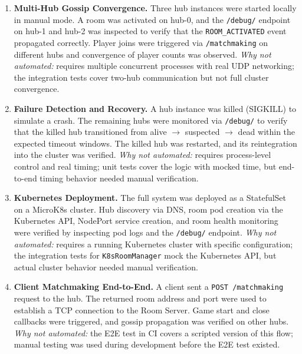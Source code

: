 \begin{enumerate}
    \item \textbf{Multi-Hub Gossip Convergence.}
          Three hub instances were started locally in manual mode.
          A room was activated on hub-0, and the \texttt{/debug/} endpoint on hub-1 and hub-2 was inspected to verify that the \texttt{ROOM\_ACTIVATED} event propagated correctly.
          Player joins were triggered via \texttt{/matchmaking} on different hubs and convergence of player counts was observed.
          \textit{Why not automated:} requires multiple concurrent processes with real UDP networking; the integration tests cover two-hub communication but not full cluster convergence.

    \item \textbf{Failure Detection and Recovery.}
          A hub instance was killed (SIGKILL) to simulate a crash.
          The remaining hubs were monitored via \texttt{/debug/} to verify that the killed hub transitioned from alive $\rightarrow$ suspected $\rightarrow$ dead within the expected timeout windows.
          The killed hub was restarted, and its reintegration into the cluster was verified.
          \textit{Why not automated:} requires process-level control and real timing; unit tests cover the logic with mocked time, but end-to-end timing behavior needed manual verification.

    \item \textbf{Kubernetes Deployment.}
          The full system was deployed as a StatefulSet on a MicroK8s cluster.
          Hub discovery via DNS, room pod creation via the Kubernetes API, NodePort service creation, and room health monitoring were verified by inspecting pod logs and the \texttt{/debug/} endpoint.
          \textit{Why not automated:} requires a running Kubernetes cluster with specific configuration; the integration tests for \texttt{K8sRoomManager} mock the Kubernetes API, but actual cluster behavior needed manual verification.

    \item \textbf{Client Matchmaking End-to-End.}
          A client sent a \texttt{POST /matchmaking} request to the hub.
          The returned room address and port were used to establish a TCP connection to the Room Server.
          Game start and close callbacks were triggered, and gossip propagation was verified on other hubs.
          \textit{Why not automated:} the E2E test in CI covers a scripted version of this flow; manual testing was used during development before the E2E test existed.
\end{enumerate}

